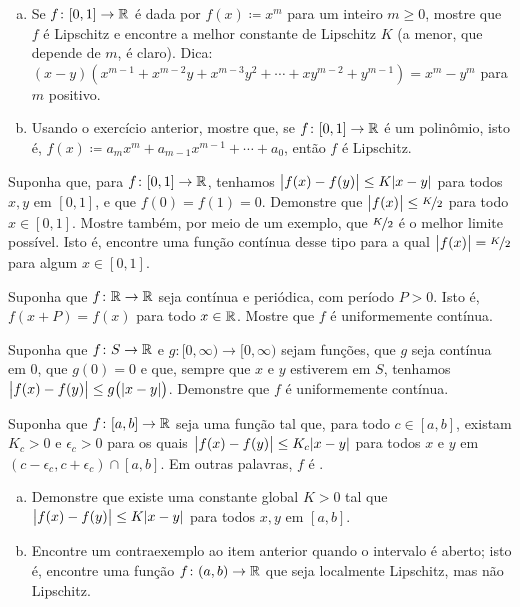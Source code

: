 \begin{exercise}
\pagebreak[2]
\leavevmode
\begin{enumerate}[a)]
\item
Se $f \colon [0,1] \to {\mathbb{R}}$ é dada por $f(x) \coloneqq x^m$ para um inteiro
$m \geq 0$, mostre que $f$ é Lipschitz e encontre a melhor constante de
Lipschitz $K$ (a menor, que depende de $m$, é claro).
Dica:
$(x-y)(x^{m-1} + x^{m-2}y + x^{m-3}y^2 + \cdots + x y^{m-2} + y^{m-1}) = x^m
- y^m$ para $m$ positivo.
\item
Usando o exercício anterior, mostre que, se $f \colon [0,1] \to {\mathbb{R}}$
é um polinômio, isto é,
$f(x) \coloneqq a_m x^m + a_{m-1} x^{m-1} + \cdots + a_0$,
então $f$ é Lipschitz.
\end{enumerate}
\end{exercise}

\begin{exercise}
\pagebreak[2]
Suponha que, para $f \colon [0,1] \to {\mathbb{R}}$, tenhamos
$\bigl\lvert {f(x)-f(y)} \bigr\rvert \leq K \lvert {x-y} \rvert$ para todos $x,y$ em $[0,1]$,
e que $f(0) = f(1) = 0$.
Demonstre que $\bigl\lvert {f(x)} \bigr\rvert \leq \nicefrac{K}{2}$ para todo $x \in [0,1]$.
Mostre também, por meio de um exemplo, que $\nicefrac{K}{2}$ é o melhor
limite possível. Isto é, encontre uma função contínua desse tipo
para a qual $\bigl\lvert {f(x)} \bigr\rvert = \nicefrac{K}{2}$ para algum $x \in [0,1]$.
\end{exercise}

\begin{exercise}
Suponha que $f \colon {\mathbb{R}} \to {\mathbb{R}}$ seja contínua e periódica, com período
$P > 0$. Isto é, $f(x+P) = f(x)$ para todo $x \in {\mathbb{R}}$. Mostre que $f$
é uniformemente contínua.
\end{exercise}

\begin{exercise}
Suponha que $f \colon S \to {\mathbb{R}}$ e $g \colon [0,\infty) \to [0,\infty)$
sejam funções, que $g$ seja contínua em $0$, que $g(0) = 0$ e que,
sempre que $x$ e $y$ estiverem em $S$, tenhamos
$\bigl\lvert {f(x)-f(y)} \bigr\rvert \leq g\bigl(\lvert {x-y} \rvert\bigr)$.
Demonstre que $f$ é uniformemente contínua.
\end{exercise}

\begin{exercise}
Suponha que $f \colon [a,b] \to {\mathbb{R}}$ seja uma função tal que, para todo
$c \in [a,b]$, existam $K_c > 0$ e $\epsilon_c > 0$ para os quais
$\bigl\lvert {f(x)-f(y)} \bigr\rvert \leq K_c \lvert {x-y} \rvert$ para todos $x$ e $y$ em
$(c-\epsilon_c,c+\epsilon_c) \cap [a,b]$. Em outras palavras, $f$ é
.
\begin{enumerate}[a)]
\item
Demonstre que existe uma constante global $K > 0$ tal que
$\bigl\lvert {f(x)-f(y)} \bigr\rvert \leq K \lvert {x-y} \rvert$ para todos $x,y$ em $[a,b]$.
\item
Encontre um contraexemplo ao item anterior quando o intervalo é aberto;
isto é, encontre uma função $f \colon (a,b) \to {\mathbb{R}}$ que seja localmente
Lipschitz, mas não Lipschitz.
\end{enumerate}
\end{exercise}

